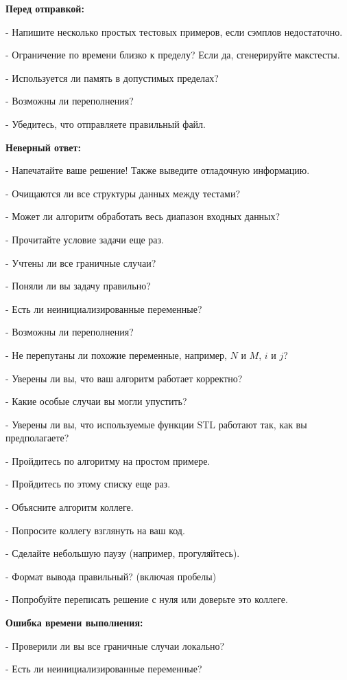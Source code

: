 \textbf{Перед отправкой:}  

- Напишите несколько простых тестовых примеров, если сэмплов недостаточно.  

- Ограничение по времени близко к пределу? Если да, сгенерируйте макстесты.  

- Используется ли память в допустимых пределах?  

- Возможны ли переполнения?  

- Убедитесь, что отправляете правильный файл.  


\textbf{Неверный ответ:}  

- Напечатайте ваше решение! Также выведите отладочную информацию.  

- Очищаются ли все структуры данных между тестами?  

- Может ли алгоритм обработать весь диапазон входных данных?  

- Прочитайте условие задачи еще раз.  

- Учтены ли все граничные случаи?  

- Поняли ли вы задачу правильно?  

- Есть ли неинициализированные переменные?  

- Возможны ли переполнения?  

- Не перепутаны ли похожие переменные, например, $N$ и $M$, $i$ и $j$?  

- Уверены ли вы, что ваш алгоритм работает корректно?  

- Какие особые случаи вы могли упустить?  

- Уверены ли вы, что используемые функции STL работают так, как вы предполагаете?  

- Пройдитесь по алгоритму на простом примере.  

- Пройдитесь по этому списку еще раз.  

- Объясните алгоритм коллеге.  

- Попросите коллегу взглянуть на ваш код.  

- Сделайте небольшую паузу (например, прогуляйтесь).  

- Формат вывода правильный? (включая пробелы)  

- Попробуйте переписать решение с нуля или доверьте это коллеге.  


\textbf{Ошибка времени выполнения:}  

- Проверили ли вы все граничные случаи локально?  

- Есть ли неинициализированные переменные?  

